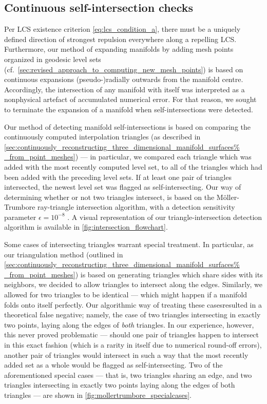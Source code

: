 \subsection{Continuous self-intersection checks}
\label{sub:continuous_self_intersection_checks}

Per LCS existence criterion \eqref{eq:lcs_condition_a}, there must be a
uniquely defined direction of strongest repulsion everywhere along a repelling
LCS. Furthermore, our method of expanding manifolds by adding mesh points
organized in geodesic level sets (cf.\
\cref{sec:revised_approach_to_computing_new_mesh_points}) is based on
continuous expansions (pseudo-)radially outwards from the manifold centre.
Accordingly, the intersection of any manifold with itself was interpreted as
a nonphysical artefact of accumulated numerical error. For that reason, we
sought to terminate the expansion of a manifold when self-intersections
were detected.

Our method of detecting manifold self-intersections is based on comparing the
continuously computed interpolation triangles (as described in
\cref{sec:continuously_reconstructing_three_dimensional_manifold_surfaces%
_from_point_meshes}) --- in particular, we compared each triangle which was
added with the most recently computed level set, to all of the
triangles which had been added with the preceding level sets. If at least one
pair of triangles intersected, the newest level set was flagged as
self-intersecting. Our way of determining whether or not two triangles
intersect, is based on the Möller-Trumbore ray-triangle intersection algorithm,
with a detection sensitivity parameter $\epsilon=10^{-8}$
\parencite{moller1997fast}. A visual representation of our
triangle-intersection detection algorithm is available in
\cref{fig:intersection_flowchart}.



Some cases of intersecting triangles warrant special treatment. In particular,
as our triangulation method (outlined in
\cref{sec:continuously_reconstructing_three_dimensional_manifold_surfaces%
_from_point_meshes}) is based on generating triangles which share sides with
its neighbors, we decided to allow triangles to intersect along the edges.
Similarly, we allowed for two triangles to be identical --- which might happen
if a manifold folds onto itself perfectly. Our algorithmic way of treating
these casesresulted in a theoretical false negative; namely, the case of two
triangles intersecting in exactly two points, laying along the edges of
\emph{both} triangles. In our experience, however, this never proved
problematic --- should one pair of triangles happen to intersect in this exact
fashion (which is a rarity in itself due to numerical round-off errors),
another pair of triangles would intersect in such a way that the most recently
added set as a whole would be flagged as self-intersecting. Two of the
aforementioned special cases --- that is, two triangles sharing an edge, and
two triangles intersecting in exactly two points laying along the edges of both
triangles --- are shown in \cref{fig:mollertrumbore_specialcases}.

